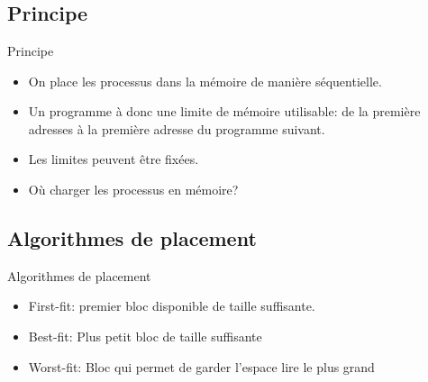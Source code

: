 \section{\sectitle}
\begin{frame}{\sectitle}
\def\subsectitle{Principe}
\subsection{\subsectitle}
\begin{block}{\subsectitle}
\begin{itemize}
    \item On place les processus dans la mémoire de manière séquentielle.
    \item Un programme à donc une limite de mémoire utilisable: de la première
    adresses à la première adresse du programme suivant.
    \item Les limites peuvent être fixées.
    \item Où charger les processus en mémoire?
\end{itemize}
\end{block}

\def\subsectitle{Algorithmes de placement}
\subsection{\subsectitle}
\begin{block}{\subsectitle}
\begin{itemize}
    \item First-fit: premier bloc disponible de taille suffisante.
    \item Best-fit: Plus petit bloc de taille suffisante
    \item Worst-fit: Bloc qui permet de garder l'espace lire le plus grand
\end{itemize}
\end{block}
\end{frame}


